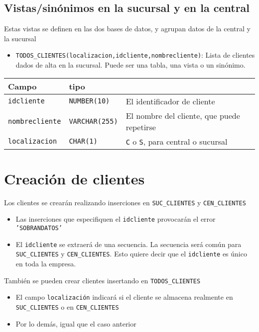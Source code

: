 \documentclass[a4paper]{article}
\begin{document}
\subsection{Vistas/sinónimos en la sucursal y en la central}
\label{sec:org000000c}
Estas vistas se definen en las dos bases de datos, y agrupan datos de la central y la sucursal
\begin{itemize}
\item \texttt{TODOS\_CLIENTES(localizacion,idcliente,nombrecliente)}: Lista de clientes dados de alta en la sucursal. Puede ser una tabla, una vista o un sinónimo.
\end{itemize}


\begin{center}
\begin{tabular}{lll}
Campo & tipo & \\[0pt]
\hline
\texttt{idcliente} & \texttt{NUMBER(10)} & El identificador de cliente\\[0pt]
\texttt{nombrecliente} & \texttt{VARCHAR(255)} & El nombre del cliente, que puede repetirse\\[0pt]
\texttt{localizacion} & \texttt{CHAR(1)} & \texttt{C} o \texttt{S}, para central o sucursal\\[0pt]
\end{tabular}
\end{center}


\newpage
\section{Creación de clientes}
\label{sec:org0000012}
Los clientes se crearán realizando inserciones en \texttt{SUC\_CLIENTES} y \texttt{CEN\_CLIENTES}
\begin{itemize}
\item Las inserciones que especifiquen el \texttt{idcliente} provocarán el error \texttt{'SOBRANDATOS'}
\item El \texttt{idcliente} se extraerá de una secuencia. La secuencia será común para \texttt{SUC\_CLIENTES} y \texttt{CEN\_CLIENTES}. Esto quiere decir que el \texttt{idcliente} es único en toda la empresa.
\end{itemize}
También se pueden crear clientes insertando en \texttt{TODOS\_CLIENTES}
\begin{itemize}
\item El campo \texttt{localización} indicará si el cliente se almacena realmente en \texttt{SUC\_CLIENTES} o en \texttt{CEN\_CLIENTES}
\item Por lo demás, igual que el caso anterior
\end{itemize}
\end{document}

